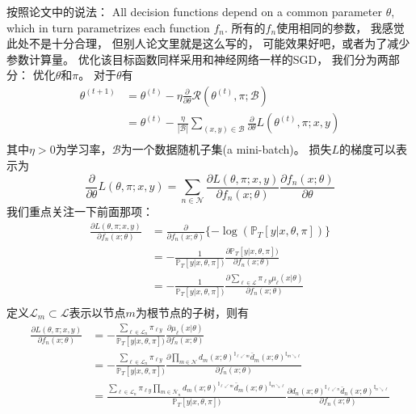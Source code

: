 \documentclass[UTF8]{ctexart}
\begin{document}
按照论文中的说法：
All decision functions depend on a common parameter $\theta$,
which in turn parametrizes each function $f_n$.
所有的$f_n$使用相同的参数，
我感觉此处不是十分合理，
但别人论文里就是这么写的，
可能效果好吧，或者为了减少参数计算量。
优化该目标函数同样采用和神经网络一样的SGD，
我们分为两部分：
优化$\theta$和$\pi$。
对于$\theta$有
$$
\begin{aligned}
\theta^{(t+1)}&=
\theta^{(t)}-\eta
\frac{\partial}{\partial\theta}\mathcal{R}(\theta^{(t)},\pi;\mathcal{B})\\
&=\theta^{(t)}-
\frac{\eta}{|\mathcal{B}|}\sum_{(x,y)\in\mathcal{B}}
\frac{\partial}{\partial\theta}L(\theta^{(t)},\pi;x,y)\\
\end{aligned}
$$
其中$\eta>0$为学习率，$\mathcal{B}$为一个数据随机子集(a mini-batch)。
损失$L$的梯度可以表示为
$$
\frac{\partial}{\partial\theta}L(\theta,\pi;x,y)=
\sum_{n\in\mathcal{N}}
\frac{\partial L(\theta,\pi;x,y)}{\partial f_n(x;\theta)}
\frac{\partial f_n(x;\theta)}{\partial \theta}
$$
我们重点关注一下前面那项：
$$
\begin{aligned}
\frac{\partial L(\theta,\pi;x,y)}{\partial f_n(x;\theta)}
&= \frac{\partial}{\partial f_n(x;\theta)}
\{-\log(\mathbb{P}_{T}[y|x,\theta,\pi])\}\\
&= -\frac{1}{\mathbb{P}_{T}[y|x,\theta,\pi])}
\frac{\partial \mathbb{P}_{T}[y|x,\theta,\pi])}{\partial f_n(x;\theta)}\\
&= -\frac{1}{\mathbb{P}_{T}[y|x,\theta,\pi])}
\frac{\partial\sum_{\ell\in\mathcal{L}}\pi_{\ell y}\mu_{\ell}(x|\theta)}{\partial f_n(x;\theta)}
\\
\end{aligned}
$$
定义$\mathcal{L}_m\subset\mathcal{L}$表示以节点$m$为根节点的子树，则有
$$
\begin{aligned}
\frac{\partial L(\theta,\pi;x,y)}{\partial f_n(x;\theta)}
&= -\frac{\sum_{\ell\in\mathcal{L}_n}\pi_{\ell y}}{\mathbb{P}_{T}[y|x,\theta,\pi])}
\frac{\partial\mu_{\ell}(x|\theta)}{\partial f_n(x;\theta)}\\
&=-\frac{\sum_{\ell\in\mathcal{L}_n}\pi_{\ell y}}{\mathbb{P}_{T}[y|x,\theta,\pi])}
\frac{
\partial
\prod_{m\in\mathcal{N}}
d_m(x;\theta)^{\mathbb{I}_{\ell\swarrow m}}
\bar{d}_m(x;\theta)^{\mathbb{I}_{m\searrow\ell}}
}
{\partial f_n(x;\theta)}\\
&=\frac{
\sum_{\ell\in\mathcal{L}_n}\pi_{\ell y}
\prod_{m\in\mathcal{\bar{N}}_n}
d_m(x;\theta)^{\mathbb{I}_{\ell\swarrow m}}
\bar{d}_m(x;\theta)^{\mathbb{I}_{m\searrow\ell}}
}{\mathbb{P}_{T}[y|x,\theta,\pi])}
\frac{
\partial
d_n(x;\theta)^{\mathbb{I}_{\ell\swarrow n}}
\bar{d}_n(x;\theta)^{\mathbb{I}_{n\searrow\ell}}
}
{\partial f_n(x;\theta)}\\
\end{aligned}
$$
\end{document}

